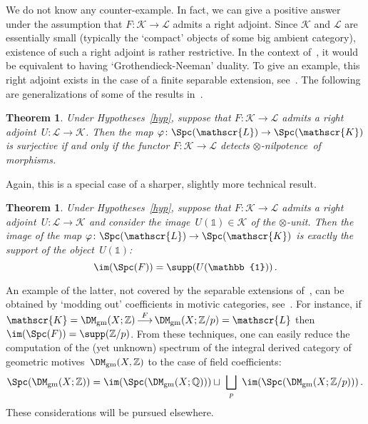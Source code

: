 \documentclass{amsart}
\numberwithin{equation}{section}
\newtheorem{Thm}[equation]{Theorem}
\theoremstyle{remark}
\begin{document}
We do not know any counter-example. In fact, we can give a positive answer under the assumption that $F\colon {\mathscr{{K}}}\to {\mathscr{{L}}}$ admits a right adjoint. Since ${\mathscr{{K}}}$ and ${\mathscr{{L}}}$ are essentially small (typically the `compact' objects of some big ambient category), existence of such a right adjoint is rather restrictive. In the context  of~\cite{BalmerDellAmbrogioSanders16}, it would be equivalent to having `Grothendieck-Neeman' duality. To give an example, this right adjoint exists in the case of a finite separable extension, see~\cite{Balmer16b}. The following are generalizations of some of the results in~\cite{Balmer16a}.

\begin{Thm}
\label{thm:FU}Under Hypotheses~\ref{hyp}, suppose that $F\colon {\mathscr{{K}}}\to {\mathscr{{L}}}$ admits a right adjoint~$U\colon{\mathscr{{L}}}\to {\mathscr{{K}}}$. Then the map $\varphi\colon{\Spc({\mathscr{L}})}\to {\Spc({\mathscr{K}})}$ is surjective if and only if the functor $F\colon{\mathscr{{K}}}\to {\mathscr{{L}}}$ detects {$\otimes$-nilpotence}\ of morphisms.
\end{Thm}

Again, this is a special case of a sharper, slightly more technical result.

\begin{Thm}
\label{thm:FU+}Under Hypotheses~\ref{hyp}, suppose that $F\colon {\mathscr{{K}}}\to {\mathscr{{L}}}$ admits a right adjoint~$U\colon{\mathscr{{L}}}\to {\mathscr{{K}}}$ and consider the image~$U({\mathbb{1}})\in{\mathscr{{K}}}$ of the $\otimes$-unit. Then the image of the map $\varphi\colon{\Spc({\mathscr{L}})}\to {\Spc({\mathscr{K}})}$ is exactly the support of the object~$U({\mathbb{1}})$:
\[
\im(\Spc(F))=\supp(U({\mathbb{1}}))\,.
\]
\end{Thm}

An example of the latter, not covered by the separable extensions of~\cite{Balmer16a}, can be obtained by `modding out' coefficients in motivic categories, see~\cite[Chap.\,5]{VoevodskySuslinFriedlander00}. For instance, if ${\mathscr{{K}}}={\DM_{\text{gm}}}(X;{\mathbb{Z}}){\overset{{F}}{\,{\mathop{\longrightarrow}\limits}\,}}{\DM_{\text{gm}}}(X;{\mathbb{Z}}/p)={\mathscr{{L}}}$ then $\im(\Spc(F))=\supp({\mathbb{Z}}/p)$. From these techniques, one can easily reduce the computation of the (yet unknown) spectrum of the integral derived category of geometric motives~${\DM_{\text{gm}}}(X,{\mathbb{Z}})$ to the case of field coefficients:
\[
\Spc({\DM_{\text{gm}}}(X;{\mathbb{Z}}))=\im(\Spc({\DM_{\text{gm}}}(X;{\mathbb{Q}})))\sqcup \ \bigsqcup_{p}\ \im(\Spc({\DM_{\text{gm}}}(X;{\mathbb{Z}}/p)))\,.
\]
These considerations will be pursued elsewhere.
\end{document}
